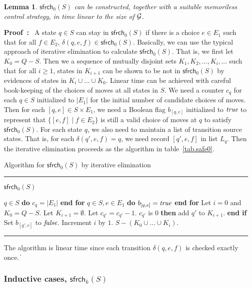 \documentclass[times,10pt,twocolumn]{article}
\newtheorem{lemma}[theorem]{Lemma}
\newcommand{\IFNLINE}[1]{\STATE {\bf if} #1 {\bf then} }
\newcommand{\ENDIFLINE}{\textbf{end if}}
\newcommand{\FORNLINE}[1]{\STATE {\bf for} #1 {\bf do} }
\newcommand{\ENDFORLINE}{\textbf{end for}}
\newcommand\safe{\mathsf{sfrch}}
\newcommand\qed{\hfill\ensuremath{\Box}}
\newcommand{\true}{\mbox{\em true}}
\newcommand{\false}{\mbox{\em false}}
\newcommand{\pf}{\noindent\mbox{\bf Proof : }}
\newcommand{\calg}{{\cal G}}
\newcommand{\procbegin}{\vspace*{3mm}\hrule\noindent}
\newcommand{\procend}{\hrule\vspace{3mm}}
\def\qed{\ifmmode\|\else{\unskip\nobreak\hfil
\penalty50\hskip1em\null\nobreak\hfil$\blacksquare$
\parfillskip=0pt\finalhyphendemerits=0\endgraf}\fi}
\begin{document}
\begin{lemma}
\label{lem:NLSafe0}
$\safe_0(S)$ can be constructed, together with a suitable memoriless
control strategy, in time linear to the size of $\calg$.
\end{lemma}
\pf 
A state $q\in S$ can stay in $\safe_0(S)$ if there is a choice $e\in E_1$ 
such that for all $f\in E_2$, $\delta(q,e,f)\in \safe_0(S)$.  
Basically, we can use the typical approach of iterative elimination 
to calculate $\safe_0(S)$. 
That is, we first let $K_0=Q-S$.  
Then we a sequence of mutually disjoint sets 
$K_1,K_2,\ldots,K_i,\ldots$ such that 
for all $i\geq 1$, states in $K_{i+1}$ can be shown to be not 
in $\safe_0(S)$ by evidences of states in $K_i\cup \ldots\cup K_0$.    
Linear time can be achieved with careful book-keeping of the choices of 
moves at all states in $S$. 
We need a counter $c_q$ for each $q\in S$ initialized to 
$|E_1|$ for the initial number of candidate choices of moves. 
Then for each $[q,e]\in S\times E_1$, we need a Boolean flag $b_{[q,e]}$ 
initialized to $\true$ to represent that 
$\{[e,f]\mid f\in E_2\}$ is still a valid choice of moves at $q$ to 
satisfy $\safe_0(S)$. 
For each state $q$, we also need to maintain a list of transition source states. 
That is, for each $\delta(q',e,f)=q$, we need 
record $[q',e,f]$ in list $L_q$.  
Then the iterative elimination proceeds as the algorithm in 
table~\ref{tab.safe0}.  
\begin{table}[!t]
\caption{Algorithm for $\safe_0(S)$ by iterative elimination} 
\label{tab.safe0}
\procbegin \noindent 
$\safe_0(S)$  
\begin{algorithmic}[1]
\FORNLINE {$q\in S$} $c_q=|E_1|$ \ENDFORLINE 
\FORNLINE {$q\in S, e\in E_1$} $b_{[q,e]}=\true$ \ENDFORLINE 
\STATE Let $i=0$ and $K_0=Q-S$. 
  \STATE Let $K_{i+1}=\emptyset$. 
    \IF {$b_{[q',e]}$ is $\true$} 
      \STATE Let $c_{q'}=c_{q'}-1$. 
      \IFNLINE {$c_{q'}$ is $0$} add $q'$ to $K_{i+1}$.  \ENDIFLINE  
    \ENDIF 
    \STATE Set $b_{[q',e]}$ to $\false$. 
  \ENDFOR
  \STATE Increment $i$ by $1$.  
\ENDWHILE 
\RETURN $S-(K_0\cup \ldots \cup K_i)$.  
\end{algorithmic}
\procend 
\end{table} 
The algorithm is linear time since each transition $\delta(q,e,f)$ is 
checked exactly once. 
\qed

\subsubsection{Inductive cases, $\safe_k(S)$} 
\end{document}
